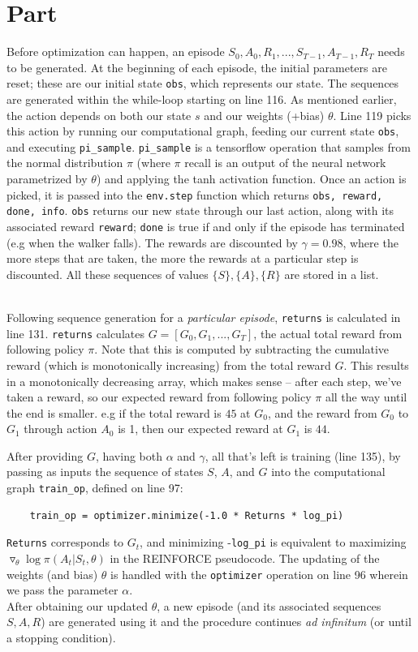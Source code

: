 \documentclass{article}
\newcommand{\enterProblemHeader}[1]{
}
\newcommand{\exitProblemHeader}[1]{
}
\newcounter{homeworkProblemCounter} %
\newcommand{\homeworkProblemName}{}
\newenvironment{homeworkProblem}[1][Part \arabic{homeworkProblemCounter}]{ %
\stepcounter{homeworkProblemCounter} %
\renewcommand{\homeworkProblemName}{#1} %
\section{\homeworkProblemName} %
\enterProblemHeader{\homeworkProblemName} %
}{
\exitProblemHeader{\homeworkProblemName} %
}
\begin{document}
\begin{homeworkProblem}
Before optimization can happen, an episode $S_0, A_0, R_1,..., S_{T-1}, A_{T-1}, R_T$ needs to be generated. At the beginning of each episode, the initial parameters are reset; these are our initial state \verb|obs|, which represents our state. The sequences are generated within the while-loop starting on line 116. As mentioned earlier, the action depends on both our state $s$ and our weights (+bias) $\theta$. Line 119 picks this action by running our computational graph, feeding our current state \verb|obs|, and executing \verb|pi_sample|. \verb|pi_sample| is a tensorflow operation that samples from the normal distribution $\pi$ (where $\pi$ recall is an output of the neural network parametrized by $\theta$) and applying the tanh activation function. Once an action is picked, it is passed into the \verb|env.step| function which returns \verb|obs, reward, done, info|. \verb|obs| returns our new state through our last action, along with its associated reward \verb|reward|; \verb|done| is true if and only if the episode has terminated (e.g when the walker falls). The rewards are discounted by $\gamma=0.98$, where the more steps that are taken, the more the rewards at a particular step is discounted. All these sequences of values $\{S\}, \{A\}, \{R\}$ are stored in a list.\\\

Following sequence generation for a \textit{particular episode}, \verb|returns| is calculated in line 131. \verb|returns| calculates $G=[G_0, G_1, ...,G_T]$, the actual total reward from following policy $\pi$. Note that this is computed by subtracting the cumulative reward (which is monotonically increasing) from the total reward $G$. This results in a monotonically decreasing array, which makes sense -- after each step, we've taken a reward, so our expected reward from following policy $\pi$ all the way until the end is smaller. e.g if the total reward is $45$ at $G_0$, and the reward from $G_0$ to $G_1$ through action $A_0$ is 1, then our expected reward at $G_1$ is $44$.

After providing $G$, having both $\alpha$ and $\gamma$, all that's left is training (line 135), by passing as inputs the sequence of states $S$, $A$, and $G$ into the computational graph \verb|train_op|, defined on line 97:

\begin{verbatim}
    train_op = optimizer.minimize(-1.0 * Returns * log_pi)
\end{verbatim}

\verb|Returns| corresponds to $G_t$, and minimizing -\verb|log_pi| is equivalent to maximizing $\triangledown_{\theta}\log \pi(A_t|S_t,\theta)$ in the REINFORCE pseudocode. The updating of the weights (and bias) $\theta$ is handled with the \verb|optimizer| operation on line 96 wherein we pass the parameter $\alpha$.\\

After obtaining our updated $\theta$, a new episode (and its associated sequences $S, A, R$) are generated using it and the procedure continues \textit{ad infinitum} (or until a stopping condition). 


\end{homeworkProblem}
\end{document}
